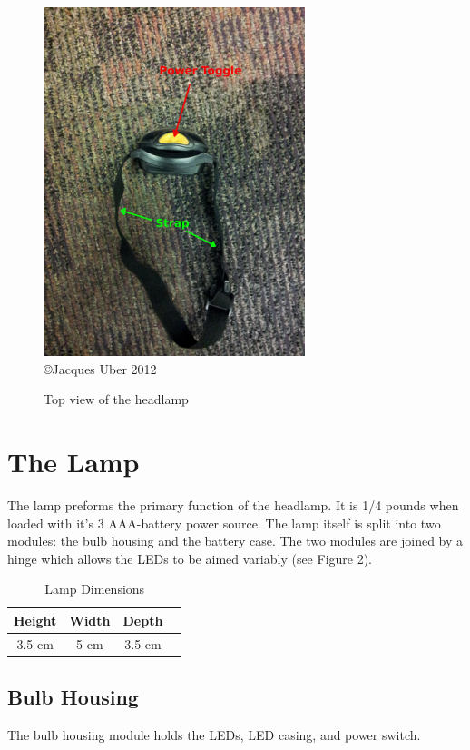 \documentclass[12pt]{article}
\begin{document}
\begin{figure}[h!]
\centering
\caption[Top view of the headlamp] {Top view of the headlamp}
\includegraphics[width=3in]{headlamp_top}
\\ {\tiny \copyright  Jacques Uber 2012}
\end{figure}

\section{The Lamp}
The lamp preforms the primary function of the headlamp. It is 1/4 pounds when loaded with
it's 3 AAA-battery power source. The lamp itself is split into two modules: the bulb housing and the
battery case. The two modules are joined by a hinge which allows the LEDs to be aimed variably (see
Figure 2).

\begin{table}[h!]
\begin{center}
\begin{tabular}{ | c | c | c | p{5cm} |}
    \hline
    Height & Width & Depth \\ \hline
    3.5 cm & 5 cm & 3.5 cm  \\ \hline
\end{tabular}
\end{center}
\caption{Lamp Dimensions}
\end{table}

\subsection{Bulb Housing}
The bulb housing module holds the LEDs, LED casing, and power switch.
\end{document}
